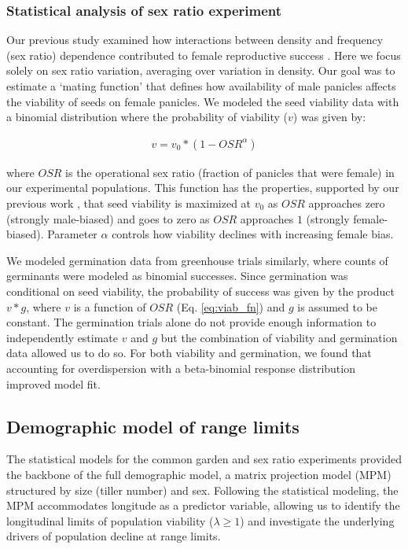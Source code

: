 \documentclass[11pt]{article}\usepackage[]{graphicx}\usepackage[]{color}
\begin{document}
\subsubsection*{Statistical analysis of sex ratio experiment}
Our previous study examined how interactions between density and frequency (sex ratio) dependence contributed to female reproductive success \citep{compagnoni2017can}. 
Here we focus solely on sex ratio variation, averaging over variation in density. 
Our goal was to estimate a `mating function' that defines how availability of male panicles affects the viability of seeds on female panicles.
We modeled the seed viability data with a binomial distribution where the probability of viability ($v$) was given by:

\begin{align}\label{eq:viab_fn}
v = v_{0} * (1 - OSR^{\alpha})
\end{align}

\noindent where $OSR$ is the operational sex ratio (fraction of panicles that were female) in our experimental populations. 
This function has the properties, supported by our previous work \citep{compagnoni2017can}, that seed viability is maximized at $v_{0}$ as $OSR$ approaches zero (strongly male-biased) and goes to zero as $OSR$ approaches $1$ (strongly female-biased).
Parameter $\alpha$ controls how viability declines with increasing female bias. 

We modeled germination data from greenhouse trials similarly, where counts of germinants were modeled as binomial successes.
Since germination was conditional on seed viability, the probability of success was given by the product $v*g$, where $v$ is a function of $OSR$ (Eq. \ref{eq:viab_fn}) and $g$ is assumed to be constant. 
The germination trials alone do not provide enough information to independently estimate $v$ and $g$ but the combination of viability and germination data allowed us to do so. 
For both viability and germination, we found that accounting for overdispersion with a beta-binomial response distribution improved model fit. 

\subsection*{Demographic model of range limits}
The statistical models for the common garden and sex ratio experiments provided the backbone of the full demographic model, a matrix projection model (MPM) structured by size (tiller number) and sex. 
Following the statistical modeling, the MPM accommodates longitude as a predictor variable, allowing us to identify the longitudinal limits of population viability ($\lambda \geq 1$) and investigate the underlying drivers of population decline at range limits. 
\end{document}
